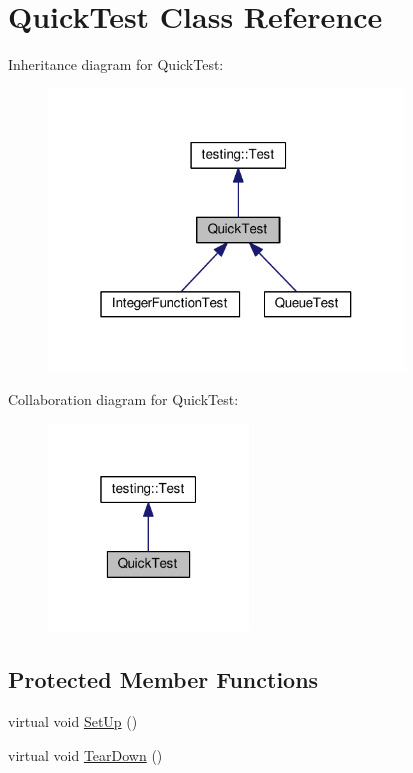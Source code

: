 \hypertarget{classQuickTest}{}\section{Quick\+Test Class Reference}
\label{classQuickTest}


Inheritance diagram for Quick\+Test\+:
\nopagebreak
\begin{figure}[H]
\begin{center}
\leavevmode
\includegraphics[width=268pt]{classQuickTest__inherit__graph}
\end{center}
\end{figure}


Collaboration diagram for Quick\+Test\+:
\nopagebreak
\begin{figure}[H]
\begin{center}
\leavevmode
\includegraphics[width=151pt]{classQuickTest__coll__graph}
\end{center}
\end{figure}
\subsection*{Protected Member Functions}
\begin{DoxyCompactItemize}
\item 
virtual void \hyperlink{classQuickTest_ae52ad082887512b92240ce40a1a05650}{Set\+Up} ()
\item 
virtual void \hyperlink{classQuickTest_a6b2d16cc0c69d30a16fe612db5abfc39}{Tear\+Down} ()
\end{DoxyCompactItemize}
